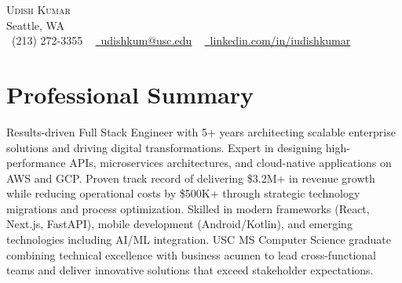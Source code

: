 \documentclass[letterpaper,10pt]{article}
\begin{document}
\begin{center}
    {\Huge \scshape Udish Kumar} \\ \vspace{1pt}
    Seattle, WA \\ \vspace{1pt}
    \small \raisebox{-0.1\height}\faPhone\ (213) 272-3355 ~ \href{mailto:udishkum@usc.edu}{\raisebox{-0.2\height}\faEnvelope\  \underline{udishkum@usc.edu}} ~ 
    \href{https://linkedin.com/in/iudishkumar/}{\raisebox{-0.2\height}\faLinkedin\ \underline{linkedin.com/in/iudishkumar}}
    \vspace{-8pt}
\end{center}
\vspace{-10pt}

\section{Professional Summary}
Results-driven Full Stack Engineer with 5+ years architecting scalable enterprise solutions and driving digital transformations. Expert in designing high-performance APIs, microservices architectures, and cloud-native applications on AWS and GCP. Proven track record of delivering \$3.2M+ in revenue growth while reducing operational costs by \$500K+ through strategic technology migrations and process optimization. Skilled in modern frameworks (React, Next.js, FastAPI), mobile development (Android/Kotlin), and emerging technologies including AI/ML integration. USC MS Computer Science graduate combining technical excellence with business acumen to lead cross-functional teams and deliver innovative solutions that exceed stakeholder expectations.
\vspace{-3pt}

\end{document}
